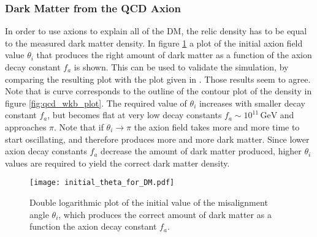 \documentclass[twoside,a4paper, 12pt]{article}
\numberwithin{equation}{section}
\begin{document}
\subsubsection{Dark Matter from the QCD Axion}
In order to use axions to explain all of the DM, the relic density has to be equal to the measured
dark matter density. In figure \ref{fig:axion_as_DM_plot} a plot of the initial axion field value $\theta_i$ that produces
the right amount of dark matter as a function of the axion decay constant $f_a$ is shown.
This can be used to validate the simulation, by comparing the resulting plot with the plot given
in \cite[Fig. 3]{LatticQCD4Cosmo}. Those results seem to agree. Note that is curve
corresponds to the outline of the contour plot of the density in figure \ref{fig:qcd_wkb_plot}.
The required value of $\theta_i$ increases with smaller decay constant $f_a$, but becomes flat at very low decay constants $f_a \sim 10^{11} \, \mathrm{GeV}$ and approaches $\pi$.
Note that if $\theta_i \rightarrow \pi$ the axion field takes
more and more time to start oscillating, and therefore produces
more and more dark matter. Since lower axion decay constants $f_a$
decrease the amount of dark matter produced, higher
$\theta_i$ values are required to yield the correct dark matter density.
\begin{figure}[H]
    \centering
    \texttt{[image: initial\_theta\_for\_DM.pdf]}
    \caption{Double logarithmic plot of the initial value of the misalignment angle $\theta_i$, which produces the correct amount
    of dark matter as a function the axion decay constant $f_a$.
    }
    \label{fig:axion_as_DM_plot}
\end{figure}
\end{document}
